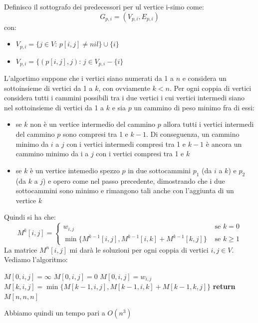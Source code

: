 \documentclass[a4paper,12pt, oneside]{book}
\begin{document}
Definisco il sottografo dei predecessori per ul vertice i-simo come:
\[G_{p,i}=(V_{p,i},E_{p,i})\]
con:
\begin{itemize}
  \item $V_{p,i}=\{j\in V:\,p[i,j]\neq nil\}\cup\{i\}$
  \item $V_{p,i}=\{(p[i,j],j):\,j\in V_{p,i}-\{i\}$
\end{itemize}
L'algortimo suppone che i vertici siano numerati da 1 a $n$ e
considera un sottoinsieme di vertici da 1 a $k$, con ovviamente
$k<n$. Per ogni coppia di vertici considera tutti i cammini possibili
tra i due vertici i cui vertici intermedi siano nel sottoinsieme di
vertici da 1 a $k$ e sia $p$ un cammino di peso minimo fra di essi:
\begin{itemize}
  \item se $k$ non è un vertice intermedio del cammino $p$ allora
  tutti i vertici intermedi del cammino $p$ sono compresi tra 1 e
  $k−1$. Di conseguenza, un cammino minimo da $i$ a $j$ con i vertici
  intermedi compresi tra 1 e $k − 1$ è ancora un cammino minimo da i a
  $j$ con i vertici compresi tra 1 e $k$
  \item se $k$ è un vertice intemedio spezzo $p$ in due sottocammini
  $p_1$ (da $i$ a $k$) e $p_2$ (da $k$ a $j$) e opero come nel passo
  precedente, dimostrando che i due sottocammini sono
  minimo e rimangono tali anche con l’aggiunta di un vertice $k$
\end{itemize}
Quindi si ha che:
\[M^k[i,j]=
  \begin{cases}
    w_{i,j} & \mbox{ se } k=0\\
    \min\{M^{k-1}[i,j], M^{k-1}[i,k]+M^{k-1}[k,j]\}  & \mbox{ se }
    k\geq 1
  \end{cases}
\]
La matrice $M^n[i,j]$ mi darà le soluzioni per ogni coppia di vertici
$i,j\in V$.
Vediamo l'algoritmo:
\begin{algorithm}[H]
  \begin{algorithmic}
    \State $M[0,i,j]=\infty$
    \Else
    \State $M[0,i,j]=0$
    \Else
    \State $M[0,i,j]=w_{i,j}$
    \EndIf
    \EndIf
    \EndFor
    \EndFor
    \State $M[k,i,j]=\min\{M[k-1,i,j],M[k-1,i,k]+M[k-1,k,j]\}$
    \EndFor
    \EndFor
    \EndFor
    \State \textbf{return} $M[n,n,n]$
    \EndFunction
  \end{algorithmic}
\end{algorithm}
Abbiamo quindi un tempo pari a $O(n^3)$
\newpage
\end{document}

